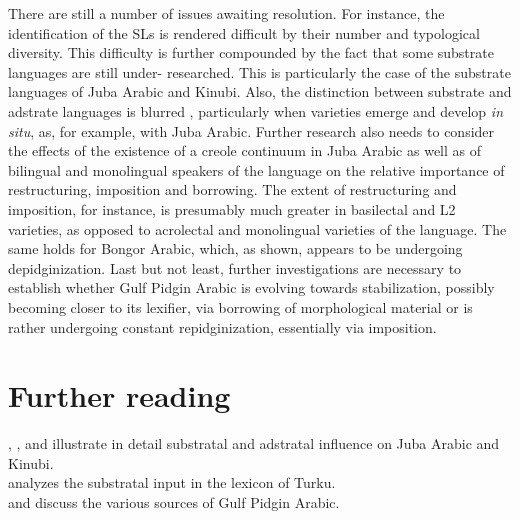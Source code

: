 \documentclass[output=paper]{langsci/langscibook}
\begin{document}
  There are still a number of issues awaiting resolution. For instance, the identification of the SLs is rendered difficult by their number and typological diversity. This difficulty is further compounded by the fact that some substrate languages are still under- researched. This is particularly the case of the substrate languages of Juba Arabic and Kinubi. Also, the distinction between substrate and adstrate languages is blurred \citep[132]{Nakao2012}, particularly when varieties emerge and develop \textit{in} \textit{situ}, as, for example, with Juba Arabic. Further research also needs to consider the effects of the existence of a creole continuum in Juba Arabic as well as of bilingual and monolingual speakers of the language on the relative importance of restructuring, imposition and borrowing. The extent of restructuring and imposition, for instance, is presumably much greater in basilectal and L2 varieties, as opposed to acrolectal and monolingual varieties of the language. The same holds for Bongor Arabic, which, as shown, appears to be undergoing depidginization. Last but not least, further investigations are necessary to establish whether Gulf Pidgin Arabic is evolving towards stabilization, possibly becoming closer to its lexifier, via borrowing of morphological material or is rather undergoing constant repidginization, essentially via imposition.  

\section*{Further reading}

\citet{Miller1993}, \citet{Nakao2012}, and \citet{Luffin2014} illustrate in detail substratal and adstratal influence on Juba Arabic and Kinubi.\\
\citet{Avram2019} analyzes the substratal input in the lexicon of Turku.\\
\citet{Avram2017article} and \citet{Bakir2017} discuss the various sources of Gulf Pidgin Arabic.
\end{document}
